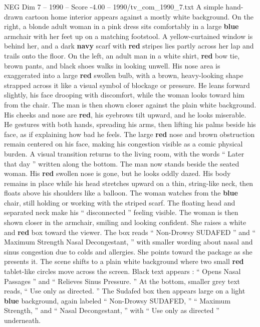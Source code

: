 \begin{textsample}{NEG Dim 7 – 1990 – Score -4.00 – 1990/tv\_com\_1990\_7.txt}  \label{ex:f7_neg_037}
A simple hand-drawn cartoon home interior appears against a mostly white background.
On the right, a blonde adult woman in a pink dress sits comfortably in a large \textbf{blue} armchair with her feet up on a matching footstool.
A yellow-curtained window is behind her, and a dark \textbf{navy} scarf with \textbf{red} stripes lies partly across her lap and trails onto the floor.
On the left, an adult man in a white shirt, \textbf{red} bow tie, brown pants, and black shoes walks in looking unwell.
His nose area is exaggerated into a large \textbf{red} swollen bulb, with a brown, heavy-looking shape strapped across it like a visual symbol of blockage or pressure.
He leans forward slightly, his face drooping with discomfort, while the woman looks toward him from the chair.
The man is then shown closer against the plain white background.
His cheeks and nose are \textbf{red}, his eyebrows tilt upward, and he looks miserable.
He gestures with both hands, spreading his arms, then lifting his palms beside his face, as if explaining how bad he feels.
The large \textbf{red} nose and brown obstruction remain centered on his face, making his congestion visible as a comic physical burden.
A visual transition returns to the living room, with the words “ Later that day ” written along the bottom.
The man now stands beside the seated woman.
His \textbf{red} swollen nose is gone, but he looks oddly dazed.
His body remains in place while his head stretches upward on a thin, string-like neck, then floats above his shoulders like a balloon.
The woman watches from the \textbf{blue} chair, still holding or working with the striped scarf.
The floating head and separated neck make his “ disconnected ” feeling visible.
The woman is then shown closer in the armchair, smiling and looking confident.
She raises a white and \textbf{red} box toward the viewer.
The box reads “ Non-Drowsy SUDAFED ” and “ Maximum Strength Nasal Decongestant, ” with smaller wording about nasal and sinus congestion due to colds and allergies.
She points toward the package as she presents it.
The scene shifts to a plain white background where two small \textbf{red} tablet-like circles move across the screen.
Black text appears : “ Opens Nasal Passages ” and “ Relieves Sinus Pressure. ” At the bottom, smaller grey text reads, “ Use only as directed. ” The Sudafed box then appears large on a light \textbf{blue} background, again labeled “ Non-Drowsy SUDAFED, ” “ Maximum Strength, ” and “ Nasal Decongestant, ” with “ Use only as directed ” underneath.

\end{textsample}
